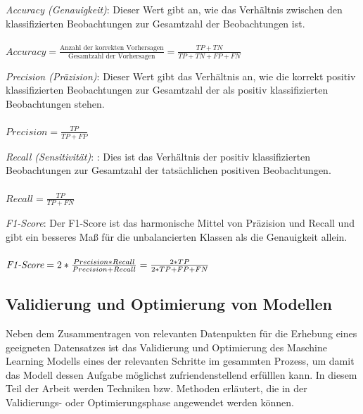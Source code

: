 \begin{description}
    \item \textit{Accuracy (Genauigkeit)}: Dieser Wert gibt an, wie das Verhältnis zwischen den klassifizierten Beobachtungen zur Gesamtzahl der Beobachtungen ist.
    \\
    \\
    $Accuracy = \frac{\text{Anzahl der korrekten Vorhersagen}}{\text{Gesamtzahl der Vorhersagen}} = \frac{TP+TN}{TP+TN+FP+FN}$

    \item \textit{Precision (Präzision)}: Dieser Wert gibt das Verhältnis an, wie die korrekt positiv klassifizierten Beobachtungen zur Gesamtzahl der als positiv klassifizierten Beobachtungen stehen.
    \\
    \\
    $Precision = \frac{TP}{TP+FP}$

    \item \textit{Recall (Sensitivität)}: : Dies ist das Verhältnis der positiv klassifizierten Beobachtungen zur Gesamtzahl der tatsächlichen positiven Beobachtungen.
    \\
    \\
    $Recall = \frac{TP}{TP+FN}$
    
    \item \textit{ F1-Score}: Der F1-Score ist das harmonische Mittel von Präzision und Recall und gibt ein besseres Maß für die unbalancierten Klassen als die Genauigkeit allein.
    \\
    \\
    $\textit{\text{F1-Score}} = 2 * \frac{Precision * Recall}{Precision + Recall} = \frac{2*TP}{2*TP + FP + FN}$
\end{description}

\pagebreak

\subsection{Validierung und Optimierung von Modellen}

Neben dem Zusammentragen von relevanten Datenpukten für die Erhebung eines geeigneten Datensatzes ist das Validierung und Optimierung des Maschine Learning Modells eines der relevanten Schritte im gesammten Prozess, 
um damit das Modell dessen Aufgabe möglichst zufriendenstellend erfülllen kann. 
In diesem Teil der Arbeit werden Techniken bzw. Methoden erläutert, die in der Validierungs- oder Optimierungsphase angewendet werden können.


